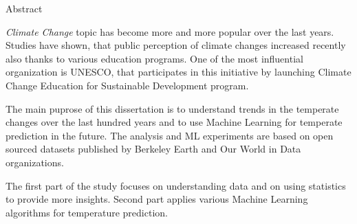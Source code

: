 \Large
\begin{center}
Abstract \\ 

\end{center}

\hspace{10pt}

\normalsize

\textit{Climate Change} topic has become more and more popular over the last years. 
Studies have shown, that public perception of climate changes increased recently \cite{publicperception} also thanks to various education programs.
One of the most influential organization is UNESCO, that participates in this initiative by launching Climate Change Education for Sustainable Development program.

The main puprose of this dissertation is to understand trends in the temperate changes over the last hundred years and to use Machine Learning for temperate prediction in the future.
The analysis and ML experiments are based on open sourced datasets published by Berkeley Earth and Our World in Data organizations.


The first part of the study focuses on understanding data and on using statistics to provide more insights.
Second part applies various Machine Learning algorithms for temperature prediction. 

